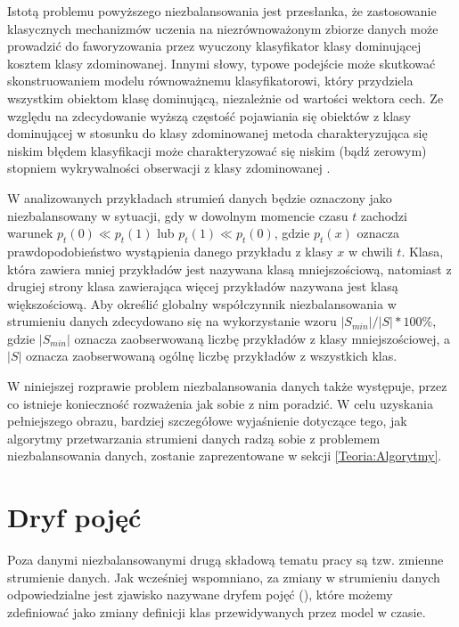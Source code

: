 Istotą problemu powyższego niezbalansowania jest przesłanka, że zastosowanie klasycznych mechanizmów uczenia na niezrównoważonym zbiorze danych może prowadzić do faworyzowania przez wyuczony klasyfikator klasy dominującej kosztem klasy zdominowanej. Innymi słowy, typowe podejście może skutkować skonstruowaniem modelu równoważnemu klasyfikatorowi, który przydziela wszystkim obiektom klasę dominującą, niezależnie od wartości wektora cech. Ze względu na zdecydowanie wyższą częstość pojawiania się obiektów z klasy dominującej w stosunku do klasy zdominowanej metoda charakteryzująca się niskim błędem klasyfikacji może charakteryzować się niskim (bądź zerowym) stopniem wykrywalności obserwacji z klasy zdominowanej \cite{MZieba}.

\label{Label:ImbalanceData}
W analizowanych przykładach strumień danych będzie oznaczony jako niezbalansowany w sytuacji, gdy w dowolnym momencie czasu $t$ zachodzi warunek $p_t(0) \ll p_t(1)$ lub $p_t(1) \ll p_t(0)$, gdzie $p_t(x)$ oznacza prawdopodobieństwo wystąpienia danego przykładu z klasy $x$ w chwili $t$. Klasa, która zawiera mniej przykładów jest nazywana klasą mniejszościową, natomiast z drugiej strony klasa zawierająca więcej przykładów nazywana jest klasą większościową. Aby określić globalny współczynnik niezbalansowania w strumieniu danych zdecydowano się na wykorzystanie wzoru $|S_{min}|/|S| * 100\%$, gdzie $|S_{min}|$ oznacza zaobserwowaną liczbę przykładów z klasy mniejszościowej, a $|S|$ oznacza zaobserwowaną ogólnę liczbę przykładów z wszystkich klas.

W niniejszej rozprawie problem niezbalansowania danych także występuje, przez co istnieje konieczność rozważenia jak sobie z nim poradzić. W celu uzyskania pełniejszego obrazu, bardziej szczegółowe wyjaśnienie dotyczące tego, jak algorytmy przetwarzania strumieni danych radzą sobie z problemem niezbalansowania danych, zostanie zaprezentowane w sekcji \ref{Teoria:Algorytmy}.


\section{Dryf pojęć}

\noindent Poza danymi niezbalansowanymi drugą składową tematu pracy są tzw. zmienne strumienie danych. Jak wcześniej wspomniano, za zmiany w strumieniu danych odpowiedzialne jest zjawisko nazywane dryfem pojęć (), które możemy zdefiniować jako zmiany definicji klas przewidywanych przez model w czasie.

